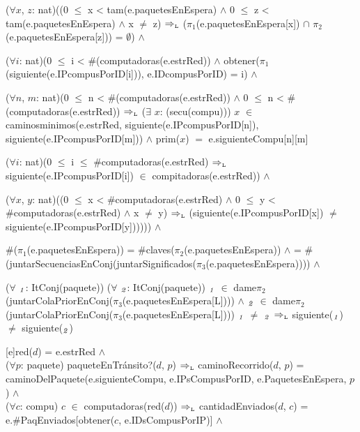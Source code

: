 \begin{Representacion}
{%
    ($\forall x$, $z$: nat)((0 $\leq$ x < tam(e.paquetesEnEspera) $\land$ 0 $\leq$ z < tam(e.paquetesEnEspera) $\land$ x $\neq$ z) $\Rightarrow_{\mathrm{\scriptscriptstyle{L}}}$ ($\pi_1$(e.paquetesEnEspera[x]) $\cap$ $\pi_2$(e.paquetesEnEspera[z])) = $\emptyset$) $\land$

		($\forall i$: nat)(0 $\leq$ i < \#(computadoras(e.estrRed)) $\land$ obtener($\pi_1$(siguiente(e.IPcompusPorID[i])), e.IDcompusPorID) = i) $\land$

		($\forall n$, $m$: nat)(0 $\leq$ n < \#(computadoras(e.estrRed)) $\land$ 0 $\leq$ n < \#(computadoras(e.estrRed)) $\Rightarrow_{\mathrm{\scriptscriptstyle{L}}}$ ($\exists$ $x$: (secu(compu))) $x$ $\in$ caminosminimos(e.estrRed, siguiente(e.IPcompusPorID[n]), siguiente(e.IPcompusPorID[m])) $\land$ prim($x$) $=$ e.siguienteCompu[n][m] 

    ($\forall i$: nat)(0 $\leq$ i $\leq$ \#computadoras(e.estrRed) $\Rightarrow_{\mathrm{\scriptscriptstyle{L}}}$ siguiente(e.IPcompusPorID[i]) $\in$ compitadoras(e.estrRed)) $\land$

    ($\forall x$, $y$: nat)((0 $\leq$ x < \#computadoras(e.estrRed) $\land$ 0 $\leq$ y < \#computadoras(e.estrRed) $\land$ x $\neq$ y) $\Rightarrow_{\mathrm{\scriptscriptstyle{L}}}$ (siguiente(e.IPcompusPorID[x]) $\neq$ siguiente(e.IPcompusPorID[y]))))) $\land$

    \#($\pi_1$(e.paquetesEnEspera)) = \#claves($\pi_2$(e.paquetesEnEspera)) $\land$ = \#(juntarSecuenciasEnConj(juntarSignificados($\pi_3$(e.paquetesEnEspera)))) $\land$

    ($\forall$ $\it_{1}$: ItConj(paquete)) ($\forall$ $\it_{2}$: ItConj(paquete)) $\it_{1}$ $\in$ dame$\pi_{2}$(juntarColaPriorEnConj($\pi_{3}$(e.paquetesEnEspera[L]))) $\land$ $\it_{2}$ $\in$ dame$\pi_{2}$(juntarColaPriorEnConj($\pi_{3}$(e.paquetesEnEspera[L]))) $\it_{1}$ $\neq$ $\it_{2}$ $\Rightarrow_{\mathrm{\scriptscriptstyle{L}}}$ siguiente($\it_{1}$) $\neq$ siguiente($\it_{2}$)
    }\mbox{} %

[e]{red($d$) = e.estrRed $\land$ \\

  ($\forall p$: paquete) paqueteEnTr\'ansito?($d$, $p$) $\Rightarrow_{\mathrm{\scriptscriptstyle{L}}}$ caminoRecorrido($d$, $p$) = caminoDelPaquete(e.siguienteCompu, e.IPsCompusPorID, e.PaquetesEnEspera, $p$) $\land$ \\

  ($\forall c$: compu) $c$ $\in$ computadoras(red($d$)) $\Rightarrow_{\mathrm{\scriptscriptstyle{L}}}$ cantidadEnviados($d$, $c$) = e.\#PaqEnviados[obtener($c$, e.IDsCompusPorIP)] $\land$ \\

}
\end{Representacion}
